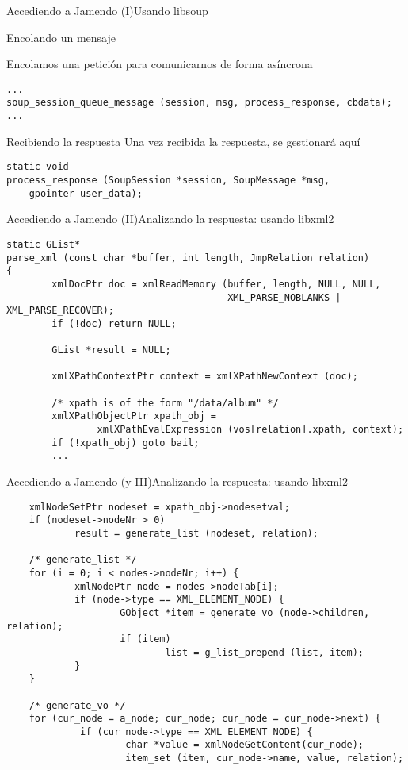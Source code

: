 \documentclass{beamer}
\begin{document}
\begin{frame}[fragile]{Accediendo a Jamendo (I)}{Usando libsoup}
\begin{block}{Encolando un mensaje}

\small{Encolamos una petición para comunicarnos de forma asíncrona}
\scriptsize{
\begin{verbatim}
...
soup_session_queue_message (session, msg, process_response, cbdata);
...
\end{verbatim}
}
\end{block}

\begin{block}{Recibiendo la respuesta}
\small{Una vez recibida la respuesta, se gestionará aquí}
\scriptsize{
\begin{verbatim}
static void
process_response (SoupSession *session, SoupMessage *msg, 
    gpointer user_data);
\end{verbatim}
}
\end{block}
\end{frame}
% 
\begin{frame}[fragile]{Accediendo a Jamendo (II)}{Analizando la respuesta:
usando libxml2}
\scriptsize{
\begin{verbatim}
static GList*
parse_xml (const char *buffer, int length, JmpRelation relation)
{
        xmlDocPtr doc = xmlReadMemory (buffer, length, NULL, NULL,
                                       XML_PARSE_NOBLANKS | XML_PARSE_RECOVER);
        if (!doc) return NULL;

        GList *result = NULL;

        xmlXPathContextPtr context = xmlXPathNewContext (doc);

        /* xpath is of the form "/data/album" */
        xmlXPathObjectPtr xpath_obj =
                xmlXPathEvalExpression (vos[relation].xpath, context);
        if (!xpath_obj) goto bail;
        ...
\end{verbatim}
}
\end{frame}

\begin{frame}[fragile]{Accediendo a Jamendo (y III)}{Analizando la respuesta:
usando libxml2}
\tiny{
\begin{verbatim}
    xmlNodeSetPtr nodeset = xpath_obj->nodesetval;
    if (nodeset->nodeNr > 0)
            result = generate_list (nodeset, relation);
    
    /* generate_list */
    for (i = 0; i < nodes->nodeNr; i++) {
            xmlNodePtr node = nodes->nodeTab[i];
            if (node->type == XML_ELEMENT_NODE) {
                    GObject *item = generate_vo (node->children, relation);
                    if (item)
                            list = g_list_prepend (list, item);
            }
    }
    
    /* generate_vo */
    for (cur_node = a_node; cur_node; cur_node = cur_node->next) {
             if (cur_node->type == XML_ELEMENT_NODE) {
                     char *value = xmlNodeGetContent(cur_node);
                     item_set (item, cur_node->name, value, relation);
\end{verbatim}
}
\end{frame}
\end{document}
